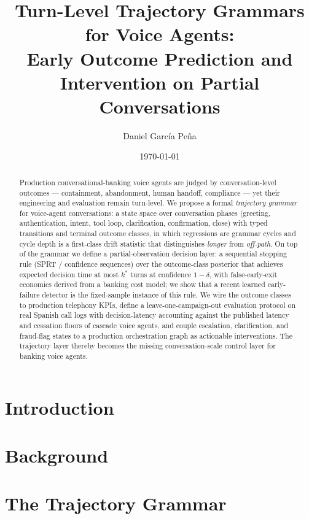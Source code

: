 \documentclass[11pt,a4paper]{article}
\title{Turn-Level Trajectory Grammars for Voice Agents:\\
Early Outcome Prediction and Intervention on Partial Conversations}
\author[1,2]{Daniel Garc\'ia Pe\~na}
\affil[1]{AI Engineering, Unicaja Bank, Spain.}
\affil[2]{\texttt{info@iamdgarcia.com} --- ORCID 0000-0002-1456-4785}
\date{\today}
\begin{document}
\maketitle

\begin{abstract}
Production conversational-banking voice agents are judged by conversation-level outcomes ---
containment, abandonment, human handoff, compliance --- yet their engineering and evaluation
remain turn-level.
We propose a formal \emph{trajectory grammar} for voice-agent conversations: a state space over
conversation phases (greeting, authentication, intent, tool loop, clarification, confirmation,
close) with typed transitions and terminal outcome classes, in which regressions are grammar
cycles and cycle depth is a first-class drift statistic that distinguishes \emph{longer} from
\emph{off-path}.
On top of the grammar we define a partial-observation decision layer: a sequential stopping rule
(SPRT / confidence sequences) over the outcome-class posterior that achieves expected decision
time at most $k^\ast$ turns at confidence $1-\delta$, with false-early-exit economics derived
from a banking cost model; we show that a recent learned early-failure detector is the
fixed-sample instance of this rule.
We wire the outcome classes to production telephony KPIs, define a leave-one-campaign-out
evaluation protocol on real Spanish call logs with decision-latency accounting against the
published latency and cessation floors of cascade voice agents, and couple escalation,
clarification, and fraud-flag states to a production orchestration graph as actionable
interventions.
The trajectory layer thereby becomes the missing conversation-scale control layer for banking
voice agents.
\end{abstract}

\section{Introduction}
\label{sec:introduction}


\section{Background}
\label{sec:background}


\section{The Trajectory Grammar}
\label{sec:grammar}

\end{document}
